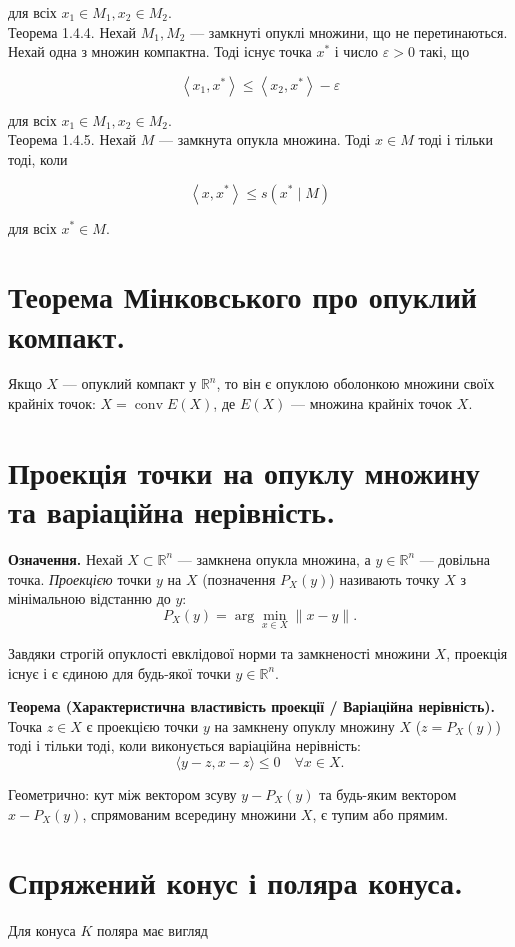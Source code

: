 \documentclass[12pt,a4paper]{extarticle}
\numberwithin{section}{part}
\begin{document}
для всіх $x_{1} \in M_{1}, x_{2} \in M_{2}$.\\
Теорема 1.4.4. Нехай $M_{1}, M_{2}$ --- замкнуті опуклі множини, що не перетинаються. Нехай одна з множин компактна. Тоді існує точка $x^{*}$ і число $\varepsilon>0$ такі, що

$$
\left\langle x_{1}, x^{*}\right\rangle \leq\left\langle x_{2}, x^{*}\right\rangle-\varepsilon
$$

для всіх $x_{1} \in M_{1}, x_{2} \in M_{2}$.\\
Теорема 1.4.5. Нехай $M$ --- замкнута опукла множина. Тоді $x \in M$ тоді і тільки тоді, коли

$$
\left\langle x, x^{*}\right\rangle \leq s\left(x^{*} \mid M\right)
$$

для всіх $x^{*} \in M$.

\section{Теорема Мінковського про опуклий компакт.}
Якщо $X$ --- опуклий компакт у $\mathbb{R}^{n}$, то він є опуклою оболонкою множини своїх крайніх точок: $X=\operatorname{conv} E(X)$, де $E(X)$ --- множина крайніх точок $X$.

\section{Проекція точки на опуклу множину та варіаційна нерівність.}
\textbf{Означення.} Нехай $X \subset \mathbb{R}^n$ --- замкнена опукла множина, а $y \in \mathbb{R}^n$ --- довільна точка. \textit{Проекцією} точки $y$ на $X$ (позначення $P_X(y)$) називають точку $X$ з мінімальною відстанню до $y$:
$$
P_X(y) = \arg\min_{x \in X} \|x - y\|.
$$

Завдяки строгій опуклості евклідової норми та замкненості множини $X$, проекція існує і є єдиною для будь-якої точки $y \in \mathbb{R}^n$.

\textbf{Теорема (Характеристична властивість проекції / Варіаційна нерівність).} Точка $z \in X$ є проекцією точки $y$ на замкнену опуклу множину $X$ ($z = P_X(y)$) тоді і тільки тоді, коли виконується варіаційна нерівність:
$$
\langle y - z, x - z \rangle \leq 0 \quad \forall x \in X.
$$

Геометрично: кут між вектором зсуву $y - P_X(y)$ та будь-яким вектором $x - P_X(y)$, спрямованим всередину множини $X$, є тупим або прямим.

\section{Спряжений конус і поляра конуса.}
Для конуса $K$ поляра має вигляд
\end{document}
